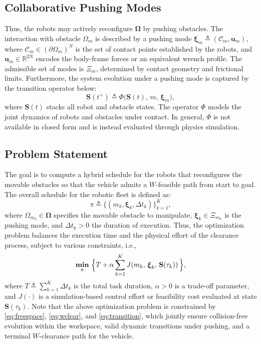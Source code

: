 \subsection{Collaborative Pushing Modes}\label{ss:interaction_mode}
Thus, the robots may actively reconfigure $\boldsymbol{\Omega}$ by pushing obstacles.
The interaction with obstacle $\Omega_m$ is described by a pushing mode
$\boldsymbol{\xi}_m\triangleq(\mathcal{C}_m,\mathbf{u}_m)$,
where $\mathcal{C}_m\in(\partial\Omega_m)^N$ is the set of contact points
established by the robots, and $\mathbf{u}_m\in\mathbb{R}^{2N}$ encodes the body-frame forces
or an equivalent wrench profile. The admissible set of
modes is $\Xi_m$, determined by contact geometry and frictional limits.
Furthermore, the system evolution under a pushing mode
is captured by the transition operator below:
\begin{equation}\label{eq:transition}
  \mathbf{S}(t^+)\triangleq\Phi\big(\mathbf{S}(t),\,m,\,\boldsymbol{\xi}_m\big),
\end{equation}
where $\mathbf{S}(t)$ stacks all robot and obstacle states. The operator
$\Phi$ models the joint dynamics of robots and obstacles under contact. In
general, $\Phi$ is not available in closed form and is instead evaluated
through physics simulation.



\subsection{Problem Statement}\label{subsec:objective}
The goal is to compute a hybrid schedule for the robots that reconfigures the movable
obstacles so that the vehicle admits a $W$-feasible path from start to goal.
The overall schedule for the robotic fleet is defined as:
\begin{equation}\label{eq:schedule}
\pi\triangleq\big\{(m_k,\boldsymbol{\xi}_k,\Delta t_k)\big\}_{k=1}^{K},
\end{equation}
where $\Omega_{m_k}\in \boldsymbol{\Omega}$ specifies the movable obstacle to manipulate,
$\boldsymbol{\xi}_k\in\Xi_{m_k}$ is the pushing mode, and
$\Delta t_k>0$ the duration of execution.
Thus, the optimization problem balances the execution time and the physical effort
of the clearance process, subject to various constraints, i.e.,
\begin{equation}\label{eq:problem}
\underset{\pi}{\textbf{min}}\ \Big{\{} T+\alpha\sum_{k=1}^{K}
J\!\left(m_k,\,\boldsymbol{\xi}_k,\,\mathbf{S}(\tau_k)\right)\Big{\}},
\end{equation}
where $T\triangleq\sum_{k=1}^{K}\Delta t_k$ is the total task duration,
$\alpha>0$ is a trade-off parameter, and $J(\cdot)$ is a simulation-based
control effort or feasibility cost evaluated at state $\mathbf{S}(\tau_k)$.
Note that the above optimization
problem is constrained by \eqref{eq:freespace}, \eqref{eq:wclear}, and
\eqref{eq:transition}, which jointly ensure collision-free evolution within
the workspace, valid dynamic transitions under pushing, and a terminal
$W$-clearance path for the vehicle.

